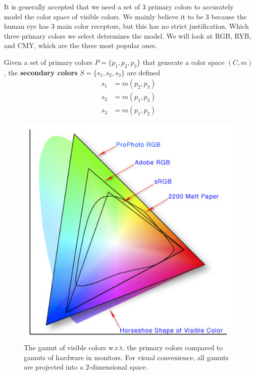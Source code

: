 It is generally accepted that we need a set of 3 primary colors to accurately model the color space of visible colors. We mainly believe it to be 3 because the human eye has 3 main color receptors, but this has no strict justification. Which three primary colors we select determines the model. We will look at RGB, RYB, and CMY, which are the three most popular ones. 

\begin{definition}
  Given a set of primary colors $P = \{p_1, p_2, p_3\}$ that generate a color space $(C, m)$, the \textbf{secondary colors} $S = \{s_1, s_2, s_3\}$ are defined 
  \begin{align}
    s_1 & = m(p_2, p_3) \\ 
    s_2 & = m(p_1, p_3) \\ 
    s_3 & = m(p_1, p_2) 
  \end{align}
\end{definition} 

\begin{figure}[H]
  \centering 
  \includegraphics[scale=0.4]{img/colorspace.png}
  \caption{The gamut of visible colors w.r.t. the primary colors compared to gamuts of hardware in monitors. For visual convenience, all gamuts are projected into a 2-dimensional space.} 
  \label{fig:colorspace}
\end{figure} 

